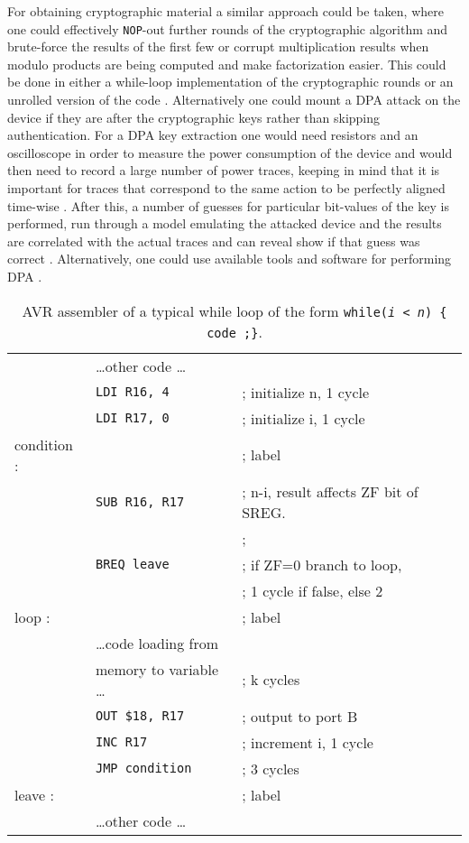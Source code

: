 For obtaining cryptographic material a similar approach could be taken, where one could effectively \texttt{NOP}-out further rounds of the cryptographic algorithm and brute-force the results of the first few \citep{glitches_paper}\citep{sergei:thesis} or corrupt multiplication results when modulo products are being computed and make factorization easier\citep{anderson:cautionary_note}. This could be done in either a while-loop implementation of the cryptographic rounds or an unrolled version of the code \citep{glitches_paper}. Alternatively one could mount a DPA attack on the device if they are after the cryptographic keys rather than skipping authentication. For a DPA key extraction one would need resistors and an oscilloscope in order to measure the power consumption of the device \citep{sergei:thesis} \citep{kocher:DPA} \citep{book:power_analysis} and would then need to record a large number of power traces, keeping in mind that it is important for traces that correspond to the same action to be perfectly aligned time-wise \citep{book:power_analysis}. After this, a number of guesses for particular bit-values of the key is performed, run through a model emulating the attacked device and the results are correlated with the actual traces and can reveal show if that guess was correct \citep{book:power_analysis}. Alternatively, one could use available tools and software for performing DPA \citep{chipwhisperer}.

\begin{table}
\caption{\footnotesize AVR assembler of a typical while loop of the form \texttt{while(\emph{i < n}) \{ code ;\}}.}
\label{tab:while}
\center
\begin{tabular}{ l l p{3cm} }
& \dots other code \dots & \\
&\texttt{LDI R16, 4 }& ; initialize n, 1 cycle\\
&\texttt{LDI R17, 0 }& ; initialize i, 1 cycle \\
condition : && ; label\\
& \texttt{SUB R16, R17 }& ; n-i, result affects ZF bit of SREG.\\
& & ; \\
& \texttt{BREQ leave} & ; if ZF=0 branch to loop,\\
& & ; 1 cycle if false, else 2\\
loop : & & ; label\\
& \dots code loading from &\\
& memory to variable \dots & ; k cycles\\
& \texttt{OUT \$18, R17} & ; output to port B\\
& \texttt{INC R17 }& ; increment i, 1 cycle \\
& \texttt{JMP condition }& ; 3 cycles \\
leave : && ; label \\
& \dots other code \dots & \\
\end{tabular}
\end{table}

